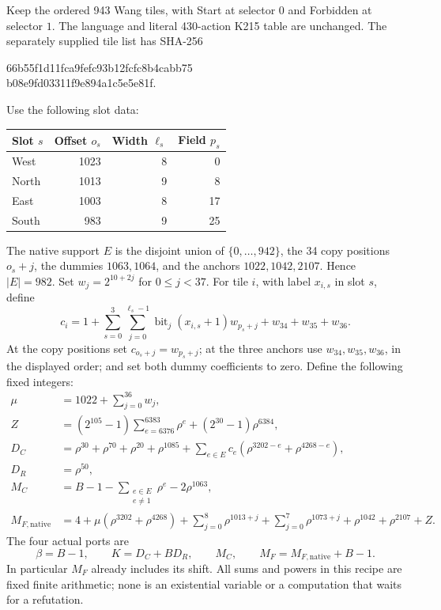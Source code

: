 Keep the ordered 943 Wang tiles, with Start at selector $0$ and Forbidden
at selector $1$.  The language and literal 430-action K215 table are
unchanged.  The separately supplied tile list has SHA-256
\begin{center}\small\ttfamily
66b55f1d11fca9fefc93b12fcfc8b4cabb75\\
b08e9fd03311f9e894a1c5e5e81f.
\end{center}
Use the following slot data:
\begin{center}
\begin{tabular}{lrrr}
\hline
Slot $s$ & Offset $o_s$ & Width $\ell_s$ & Field $p_s$\\
\hline
West & 1023 & 8 & 0\\
North & 1013 & 9 & 8\\
East & 1003 & 8 & 17\\
South & 983 & 9 & 25\\
\hline
\end{tabular}
\end{center}
The native support $E$ is the disjoint union of $\{0,\ldots,942\}$,
the 34 copy positions $o_s+j$, the dummies $1063,1064$, and the anchors
$1022,1042,2107$.  Hence $|E|=982$.  Set $w_j=2^{10+2j}$ for
$0\le j<37$.  For tile $i$, with label $x_{i,s}$ in slot $s$, define
\[
 c_i=1+\sum_{s=0}^3\sum_{j=0}^{\ell_s-1}
        \operatorname{bit}_j(x_{i,s}+1)w_{p_s+j}
        +w_{34}+w_{35}+w_{36}.
\]
At the copy positions set $c_{o_s+j}=w_{p_s+j}$; at the three anchors
use $w_{34},w_{35},w_{36}$, in the displayed order; and set both dummy
coefficients to zero.  Define the following fixed integers:
\begin{align*}
 \mu&=1022+\sum_{j=0}^{36}w_j,\\
 Z&=(2^{105}-1)\sum_{e=6376}^{6383}\rho^e
                +(2^{30}-1)\rho^{6384},\\
 D_C&=\rho^{30}+\rho^{70}+\rho^{20}+\rho^{1085}
       +\sum_{e\in E}c_e(\rho^{3202-e}+\rho^{4268-e}),\\
 D_R&=\rho^{50},\\
 M_C&=B-1-\sum_{\substack{e\in E\\e\ne1}}\rho^e-2\rho^{1063},\\
 M_{F,\mathrm{native}}&=4+\mu(\rho^{3202}+\rho^{4268})
       +\sum_{j=0}^8\rho^{1013+j}+\sum_{j=0}^7\rho^{1073+j}
       +\rho^{1042}+\rho^{2107}+Z.
\end{align*}
The four actual ports are
\begin{equation}
 \boxed{\beta=B-1,\qquad K=D_C+BD_R,\qquad
 M_C,\qquad M_F=M_{F,\mathrm{native}}+B-1.}
 \label{eq:nonzero-ports}
\end{equation}
In particular $M_F$ already includes its shift.  All sums and powers in
this recipe are fixed finite arithmetic; none is an existential variable
or a computation that waits for a refutation.


